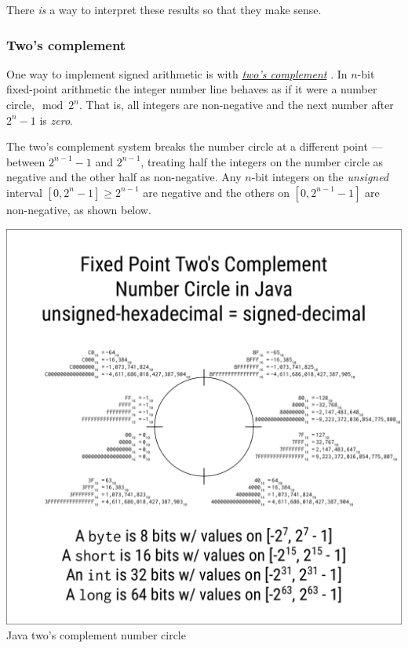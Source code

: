 \documentclass[11pt]{article}%
\begin{document}
\begin{multicols}{2}
There \textit{is} a way to interpret these results so that they make sense.

\subsubsection{Two's complement}
\label{TwosComplement}

One way to implement signed arithmetic is with \textit{\href{https://en.wikipedia.org/wiki/Two's_complement}{two's complement}} \parencite{wiki:twos-complement}. In $n$-bit fixed-point arithmetic the integer number line behaves as if it were a number circle,$\mod 2^{n}$. That is, all integers are non-negative and the next number after $2^{n}-1$ is \textit{zero}.

The two's complement system breaks the number circle at a different point --- between $2^{n - 1} - 1$ and $2^{n - 1}$, treating half the integers on the number circle as negative and the other half as non-negative. Any $n$-bit integers on the \textit{unsigned} interval $[0, 2^{n}-1] \ge 2^{n-1}$ are negative and the others on $[0, 2^{n-1} - 1]$ are non-negative, as shown below.

\end{multicols}\begin{center}
\includegraphics*[scale = 0.75]{../../images/java-number-circle.pdf}
 \\Java two's complement number circle
\end{center}\begin{multicols}{2}


\end{multicols}
\end{document}
